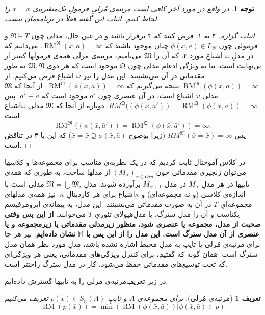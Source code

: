 \documentclass[12pt,a4paper]{report}
\theoremstyle{colorhead}
\newtheorem{defn}[thm]{تعریف}
\newtheorem{tav}[thm]{توجه}
\DeclareMathOperator{\RM}{RM}
\begin{document}
\begin{tav}
	در واقع در مورد آخر کافی  است مرتبه‌ی مُرلیِ
فرمولِ
تک‌متغیره‌ی
$x=x$
را لحاظ کنیم. اثبات این گفته فعلاً در برنامه‌مان نیست.
	\end{tav}
	\begin{proof}[اثبات گزاره]
	۴ به ۱. فرض کنید که ۴ برقرار باشد و در عین حال، مدلی چون
	$\mathfrak{N}\models T$
	و فرمولی چون
	$\phi(\bar{x},\bar{a})\in L_N$
	چنان موجود باشند که 
	$\RM^\mathfrak{N}(\bar{x},\bar{a})=\infty$.
	می‌دانیم که در مدلِ
	$\omega$
	اشباعِ مورد ۴، که آن را
	$\mathfrak{M}$
	می‌نامیم، 
	 مرتبه‌‌ی مرلی همه‌ی فرمولها کمتر از بی‌نهایت است. بنا به ویژگی ادغام مدلی چون
	$\mathfrak{Q}$
	موجود است که هر دوی
	$\mathfrak{M},\mathfrak{N}$
	به طور مقدماتی در آن می‌نشینند. این مدل را نیز
	$\omega$
	اشباع فرض می‌کنیم. از
	$\RM^\mathfrak{N}(\phi(\bar{x},\bar{a}))=\infty$
	نتیجه می‌گیریم که 
	\mbox{$\RM^\mathfrak{Q}(\phi(\bar{x},\bar{a}))=\infty$}.
	از آنجا که
	$\mathfrak{M}$
	مدلی
	$\omega$	اشباع
	 است، در آن عنصری چون
	$a'$
	موجود است که 
	$a'\equiv a$.
	پس
	\mbox{$RM^\mathfrak{Q}((\phi(\bar{x},\bar{a}'))=\RM^\mathfrak{Q}(\phi(\bar{x},\bar{a}))=\infty$.}
دوباره
	از آنجا که 
	$\mathfrak{M}$
	مدلی
	$\omega$اشباع 
	است
	\[
	\RM^\mathfrak{M}((\phi(\bar{x},\bar{a}'))=
	\RM^\mathfrak{Q}(\phi(\bar{x},\bar{a}'))=\infty;
	\]
	پس
	$RM^\mathfrak{M}(\bar{x}=\bar{x})=\infty$
	(زیرا بوضوح
	$\bar{x}=\bar{x}\supseteq \phi(\bar{x},\bar{a})$)
	که این با ۴ در تناقض است.	
	\end{proof}
در کلاس آموختال ثابت کردیم که 
در یک نظریه‌ی مناسب برای مجموعه‌ها و کلاسها
می‌توان زنجیری مقدماتی چون
$(M_\alpha)_{\alpha\in Ord}$
از مدلها ساخت، به طوری که همه‌ی تایپها در هر مدلِ
$M_\alpha$
در مدل
$M_{\alpha+1}$
برآورده شوند. مدلِ
$\mathfrak{M}=\bigcup\mathfrak{M}_i$
مدلی است با اندازه‌ی کلاسی (و نه مجموعه‌ای) و 
$\kappa$اشباع 
برای هر کاردینالِ
$\kappa$.
نیز همه‌‌ی مدلهای مجموعه‌ایِ
$T$
در آن به صورت مقدماتی می‌نشینند. این مدل، به پیمانه‌ی ایزومرفیسم یکتاست و آن را مدلِ
سترگ، یا مدلِ‌هیولای تئوریِ
$T$
می‌خوانند. \textbf{از این پس وقتی صحبت از مدل، مجموعه یا عنصری شود، منظور زیرمدلی مقدماتی یا زیرمجموعه و یا عنصری از آن مدل سترگ است. این مدل را از این پس با
$\mathbb{M}$
نشان داده‌ایم}.
نیز هر جا برای مرتبه‌ی مُرلی یا تایپ به مدلِ
محیط
 اشاره نشده باشد، مدلِ مورد نظر همان مدل سترگ است.
 همان گونه که گفتیم، 
برای کنترل
ویژگی‌های مقدماتی، یعنی هر ویژگی‌ای که تحت توسیع‌های مقدماتی حفظ می‌شود، کار در مدل سترگ راحتتر است. 
\par 
در زیر تعریفِ‌مرتبه‌ی مرلی را به تایپها گسترش داده‌ایم. 
\begin{defn}[مرتبه‌ی مُرلی]
برای مجموعه‌ی 
$A$
و تایپِ
$p(\bar{x})\in S_n(A)$
تعریف می‌کنیم
\[
\RM(p(\bar{x}))=\min (\RM(\phi(\bar{x},\bar{a}))|\phi(\bar{x},\bar{a})\in p)
\]
\end{defn}
\end{document}
